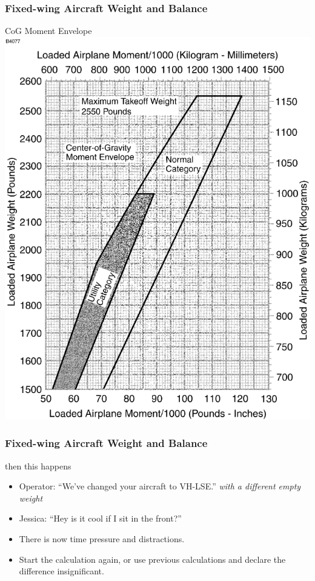 \begin{frame}
\frametitle{Fixed-wing Aircraft Weight and Balance}
\begin{block}{CoG Moment Envelope}
\includegraphics[height=0.8\textheight]{image/cg_moment_envelope.png}
\end{block}
\end{frame}

\begin{frame}
\frametitle{Fixed-wing Aircraft Weight and Balance}
\begin{block}{then this happens}
\begin{itemize}
\item<1-> Operator: ``We've changed your aircraft to VH-LSE.'' \emph{with a different empty weight}
\item<2-> Jessica: ``Hey is it cool if I sit in the front?''
\item<3-> There is now time pressure and distractions.
\item<3-> Start the calculation again, or use previous calculations and declare the difference insignificant.
\end{itemize}
\end{block}
\end{frame}

